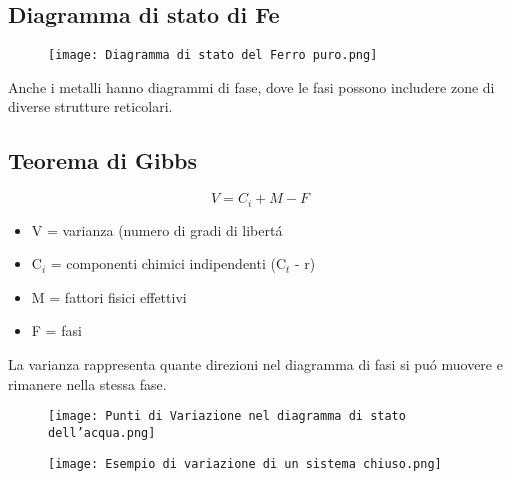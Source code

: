 \documentclass{article}
\begin{document}
{        \subsection{Diagramma di stato di Fe}
            \begin{figure}[!h]
                \centering
                \texttt{[image: Diagramma di stato del Ferro puro.png]}
            \end{figure}
            Anche i metalli hanno diagrammi di fase, dove le fasi possono includere zone di diverse strutture reticolari.
        \subsection{Teorema di Gibbs}
            \begin{equation*}
                V = C_i + M - F
            \end{equation*}
            \begin{itemize}
                \item V = varianza (numero di gradi di libert\'a
                \item C$_i$ = componenti chimici indipendenti (C$_t$ - r)
                \item M = fattori fisici effettivi
                \item F = fasi
            \end{itemize}
            La varianza rappresenta quante direzioni nel diagramma di fasi si pu\'o muovere e rimanere nella stessa fase.
            \begin{figure}[!h]
                \centering
                \texttt{[image: Punti di Variazione nel diagramma di stato dell'acqua.png]}
            \end{figure}
            \begin{figure}[!h]
                \centering
                \texttt{[image: Esempio di variazione di un sistema chiuso.png]}
            \end{figure}
}
\end{document}
